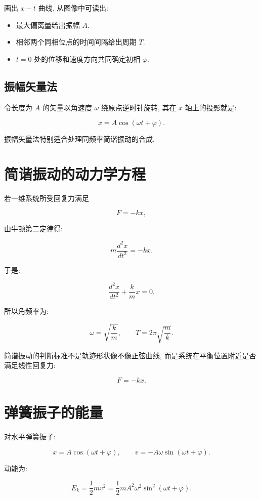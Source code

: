 \documentclass[
  a4paper,
]{ctexrep}
\providecommand{\tightlist}{%
  \setlength{\itemsep}{0pt}\setlength{\parskip}{0pt}}
\begin{document}
画出 \(x-t\) 曲线. 从图像中可读出:

\begin{itemize}
\tightlist
\item
  最大偏离量给出振幅 \(A\).
\item
  相邻两个同相位点的时间间隔给出周期 \(T\).
\item
  \(t=0\) 处的位移和速度方向共同确定初相 \(\varphi\).
\end{itemize}

\subsection{振幅矢量法}\label{ux632fux5e45ux77e2ux91cfux6cd5}

令长度为 \(A\) 的矢量以角速度 \(\omega\) 绕原点逆时针旋转, 其在 \(x\)
轴上的投影就是:

\[
x=A\cos(\omega t+\varphi).
\]

振幅矢量法特别适合处理同频率简谐振动的合成.

\section{简谐振动的动力学方程}\label{ux7b80ux8c10ux632fux52a8ux7684ux52a8ux529bux5b66ux65b9ux7a0b}

若一维系统所受回复力满足

\[
F=-kx,
\]

由牛顿第二定律得:

\[
m\frac{d^2x}{dt^2}=-kx.
\]

于是:

\[
\frac{d^2x}{dt^2}+\frac{k}{m}x=0.
\]

所以角频率为:

\[
\omega=\sqrt{\frac{k}{m}},\qquad T=2\pi\sqrt{\frac{m}{k}}.
\]

简谐振动的判断标准不是轨迹形状像不像正弦曲线,
而是系统在平衡位置附近是否满足线性回复力:

\[
F=-kx.
\]

\section{弹簧振子的能量}\label{ux5f39ux7c27ux632fux5b50ux7684ux80fdux91cf}

对水平弹簧振子:

\[
x=A\cos(\omega t+\varphi),\qquad v=-A\omega\sin(\omega t+\varphi).
\]

动能为:

\[
E_k=\frac{1}{2}mv^2=\frac{1}{2}mA^2\omega^2\sin^2(\omega t+\varphi).
\]
\end{document}
